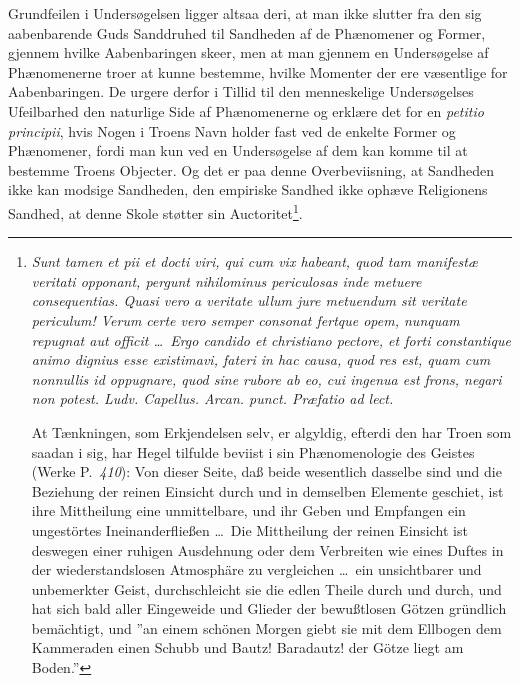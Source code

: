 \documentclass[12pt]{book}
\newcommand{\opage}[1]{\marginnote{\footnotesize\textit{[#1]}}}
\begin{document}
\opage{90} \setcounter{footnote}{0}%
Grundfeilen i Undersøgelsen ligger altsaa deri, at man ikke slutter fra den sig
aabenbarende Guds Sanddruhed til Sandheden af de Phænomener og Former, gjennem
hvilke Aabenbaringen skeer, men at man gjennem en Undersøgelse af Phænomenerne
troer at kunne bestemme, hvilke Momenter der ere væsentlige for Aabenbaringen.
De urgere derfor i Tillid til den menneskelige Undersøgelses Ufeilbarhed den
naturlige Side af Phænomenerne og erklære det for en \textit{petitio
principii}, hvis Nogen i Troens Navn holder fast ved de enkelte Former og
Phænomener, fordi man kun ved en Undersøgelse af dem kan komme til at bestemme
Troens Objecter. Og det er paa denne Overbeviisning, at Sandheden ikke kan
modsige Sandheden, den empiriske Sandhed ikke ophæve Religionens Sandhed, at
denne Skole støtter sin Auctoritet\footnote{\textit{Sunt tamen et pii et docti
viri, qui cum vix habeant, quod tam manifestæ veritati opponant, pergunt
nihilominus periculosas inde metuere consequentias. Quasi vero a veritate ullum
jure metuendum sit veritate periculum! Verum certe vero semper consonat fertque
opem, nunquam repugnat aut officit \ldots\ Ergo candido et christiano pectore,
et forti constantique animo dignius esse existimavi, fateri in hac causa, quod
res est, quam cum nonnullis id oppugnare, quod sine rubore ab eo, cui ingenua
est frons, negari non potest. Ludv. Capellus. Arcan. punct. Præfatio ad
lect.}\par
At Tænkningen, som Erkjendelsen selv, er algyldig, efterdi den har Troen som
saadan i sig, har Hegel tilfulde beviist i sin Phænomenologie des Geistes
(Werke P.~\textit{410}): Von dieser Seite, daß beide wesentlich dasselbe sind
und die Beziehung der reinen Einsicht durch und in demselben Elemente geschiet,
ist ihre Mittheilung eine unmittelbare, und ihr Geben und Empfangen ein
ungestörtes Ineinanderfließen \ldots\ Die Mittheilung der reinen Einsicht ist
deswegen einer ruhigen Ausdehnung oder dem Verbreiten wie eines Duftes in der
wiederstandslosen Atmosphäre zu vergleichen \ldots\ ein unsichtbarer und
unbemerkter Geist, durchschleicht sie die edlen Theile durch und durch, und hat
sich bald aller Eingeweide und Glieder der bewußtlosen Götzen gründlich
bemächtigt, und ”an einem schönen Morgen giebt sie mit dem Ellbogen dem
Kammeraden einen Schubb und Bautz! Baradautz! der Götze liegt am Boden.”}.
\end{document}
